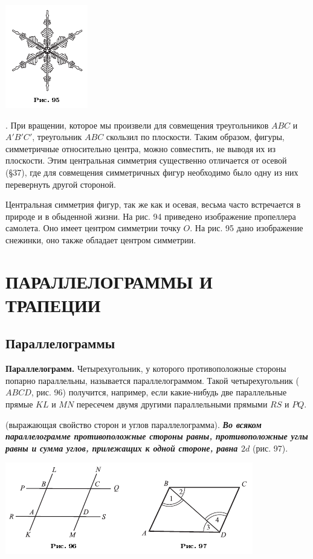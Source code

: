 \documentclass[oneside]{book}
\begin{document}
\includegraphics{pics/ris-95}

.
При вращении, которое мы произвели для совмещения треугольников $ABC$ и $A'B'C'$, треугольник $ABC$ скользил по плоскости.
Таким образом, фигуры, симметричные относительно центра, можно совместить, не выводя их из плоскости.
Этим центральная симметрия существенно отличается от осевой (§37), где для совмещения симметричных фигур необходимо было одну из них перевернуть другой стороной.

Центральная симметрия фигур, так же как и осевая, весьма часто встречается в природе и в обыденной жизни.
На рис. 94 приведено изображение пропеллера самолета.
Оно имеет центром симметрии точку $O$.
На рис. 95 дано изображение снежинки, оно также обладает центром симметрии.


\section{ПАРАЛЛЕЛОГРАММЫ И ТРАПЕЦИИ}

\subsection*{Параллелограммы}

\textbf{Параллелограмм.}
Четырехугольник, у которого противоположные стороны попарно параллельны, называется параллелограммом.
Такой четырехугольник ($ABCD$, рис. 96) получится, например, если какие-нибудь две параллельные прямые $KL$ и $MN$ пересечем двумя другими параллельными прямыми $RS$ и $PQ$.

 (выражающая свойство сторон и углов параллелограмма).
\textbf{\emph{Во всяком параллелограмме противоположные стороны равны, противоположные углы равны и сумма углов, прилежащих к одной стороне, равна $2d$}} (рис. 97).

\includegraphics{pics/ris-96-97}
\end{document}

